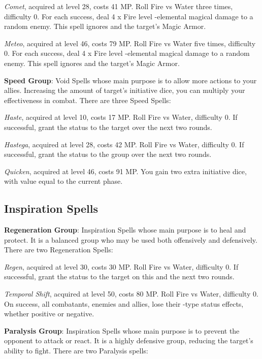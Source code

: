\begin{multicols}{2}
    \textit{Comet}, acquired at level 28, costs 41 MP. Roll Fire vs Water three times, difficulty 0. For each success, deal 4 x Fire level -elemental magical damage to a random enemy. This spell ignores  and the target’s Magic Armor.
    
    \textit{Meteo}, acquired at level 46, costs 79 MP. Roll Fire vs Water five times, difficulty 0. For each success, deal 4 x Fire level -elemental magical damage to a random enemy. This spell ignores  and the target’s Magic Armor.
    
    \textbf{Speed Group}: Void Spells whose main purpose is to allow more actions to your allies. Increasing the amount of target’s initiative dice, you can multiply your effectiveness in combat. There are three Speed Spells:
    
    \textit{Haste}, acquired at level 10, costs 17 MP. Roll Fire vs Water, difficulty 0. If successful, grant the  status to the target over the next two rounds.
    
    \textit{Hastega}, acquired at level 28, costs 42 MP. Roll Fire vs Water, difficulty 0. If successful, grant the  status to the group over the next two rounds.
    
    \textit{Quicken}, acquired at level 46, costs 91 MP. You gain two extra initiative dice, with value equal to the current phase.
    
    \subsection{Inspiration Spells}

    \textbf{Regeneration Group}: Inspiration Spells whose main purpose is to heal and protect. It is a balanced group who may be used both offensively and defensively. There are two Regeneration Spells:
    
    \textit{Regen}, acquired at level 30, costs 30 MP. Roll Fire vs Water, difficulty 0. If successful, grant the  status to the target on this and the next two rounds.
    
    \textit{Temporal Shift}, acquired at level 50, costs 80 MP. Roll Fire vs Water, difficulty 0. On success, all combatants, enemies and allies, lose their -type status effects, whether positive or negative.
    
    \textbf{Paralysis Group}: Inspiration Spells whose main purpose is to prevent the opponent to attack or react. It is a highly defensive group, reducing the target’s ability to fight. There are two Paralysis spells:
    

\end{multicols}
